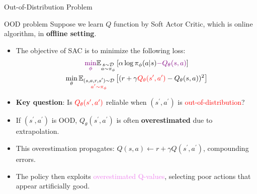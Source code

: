 \documentclass[11pt, aspectratio=169]{beamer}
\newcommand{\mbb}[1]{\mathbb{#1}}
\newcommand{\mc}[1]{\mathcal{#1}}
\newcommand{\tb}[1]{\textbf{#1}}
\begin{document}
\begin{frame}{Out-of-Distribution Problem}
    \begin{block}{OOD problem}
      Suppose we learn $Q$ function by Soft Actor Critic, which is online algorithm, in \tb{offline setting}.
      \begin{itemize}
        \item The objective of SAC is to minimize the following loss:
        $$
        \begin{gathered}
        \textcolor{violet}{\min_\phi} \mbb{E}_{\substack{s \sim \mc{D} \\ a \sim \pi_\phi}}\left[\alpha \log \pi_\phi(a|s) \textcolor{violet}{- Q_\theta(s,a)}\right] \\
        \min_\theta \mbb{E}_{\substack{(s,a,r,s^\prime) \sim \mc{D} \\ \textcolor{red}{a^\prime \sim \pi_\phi}} }\left[ (r + \gamma \textcolor{red}{Q_\theta(s^\prime, a^\prime)}  - Q_\theta (s,a))^2\right]
        \end{gathered}
        $$
        \item \tb{Key question}: Is $\textcolor{red}{Q_\theta (s^\prime, a^\prime)}$ reliable when $(s^\prime, a^\prime)$ is \textcolor{red}{out-of-distribution}?
        \item If $(s^\prime, a^\prime)$ is OOD, $Q_\theta(s^\prime, a^\prime)$ is often \tb{overestimated} due to extrapolation.
        \item This overestimation propagates: $Q(s,a) \leftarrow r + \gamma Q(s^\prime, a^\prime)$, compounding errors.
        \item The policy then exploits \textcolor{violet}{overestimated Q-values}, selecting poor actions that appear artificially good.


      \end{itemize}
    \end{block}
\end{frame}
\end{document}
